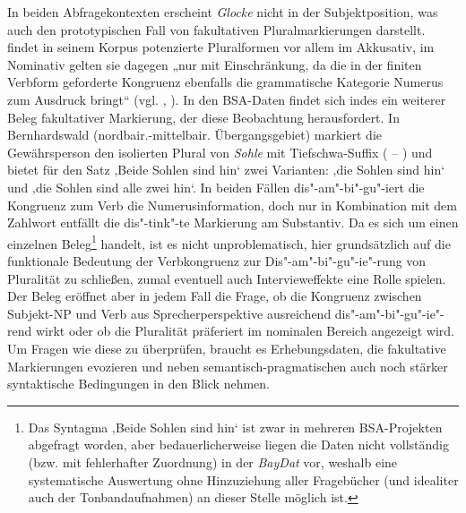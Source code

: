 In beiden Abfragekontexten erscheint \textit{Glocke} nicht in der Subjektposition, was auch den prototypischen Fall von fakultativen Pluralmarkierungen darstellt. \citet[124]{Steininger1994} findet in seinem Korpus potenzierte Pluralformen vor allem im Akkusativ, im Nominativ gelten sie dagegen „nur mit Einschränkung, da die in der finiten Verbform geforderte Kongruenz ebenfalls die grammatische Kategorie Numerus zum Ausdruck bringt“ (vgl. \citealt[§140.7]{Kollmer1987}, \citealt[159]{Rowley1997}). In den BSA-Daten findet sich indes ein weiterer Beleg fakultativer Markierung, der diese Beobachtung herausfordert. In Bernhardswald (nordbair.-mittelbair. Übergangsgebiet) markiert die Gewährsperson den isolierten Plural von \textit{Sohle} mit Tiefschwa-Suffix ( -- ) und bietet für den Satz ‚Beide Sohlen sind hin‘ zwei Varianten:    ‚die Sohlen sind hin‘ und      ‚die Sohlen sind alle zwei hin‘. In beiden Fällen dis"-am"-bi"-gu"-iert die Kongruenz zum Verb die Numerusinformation, doch nur in Kombination mit dem Zahlwort entfällt die dis"-tink"-te Markierung am Substantiv. Da es sich um einen einzelnen Beleg\footnote{Das
    Syntagma ‚Beide Sohlen sind hin‘ ist zwar in mehreren BSA-Projekten abgefragt worden, aber bedauerlicherweise liegen die Daten nicht vollständig (bzw. mit fehlerhafter Zuordnung) in der \textit{BayDat} vor, weshalb eine systematische Auswertung ohne Hinzuziehung aller Fragebücher (und idealiter auch der Tonbandaufnahmen) an dieser Stelle möglich ist.}
handelt, ist es nicht unproblematisch, hier grundsätzlich auf die funktionale Bedeutung der Verbkongruenz zur Dis"-am"-bi"-gu"-ie"-rung von Pluralität zu schließen, zumal eventuell auch Intervieweffekte eine Rolle spielen. Der Beleg eröffnet aber in jedem Fall die Frage, ob die Kongruenz zwischen Subjekt-NP und Verb aus Sprecherperspektive ausreichend dis"-am"-bi"-gu"-ie"-rend wirkt oder ob die Pluralität präferiert im nominalen Bereich angezeigt wird. Um Fragen wie diese zu überprüfen, braucht es Erhebungsdaten, die fakultative Markierungen evozieren und neben semantisch-pragmatischen auch noch stärker syntaktische Bedingungen in den Blick nehmen.
